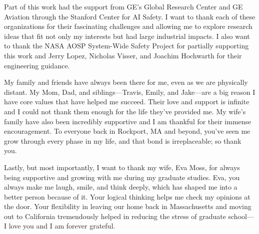 Part of this work had the support from GE's Global Research Center and GE Aviation through the Stanford Center for AI Safety.
I want to thank each of these organizations for their fascinating challenges and allowing me to explore research ideas that fit not only my interests but had large industrial impacts.
I also want to thank the NASA AOSP System-Wide Safety Project for partially supporting this work and Jerry Lopez, Nicholas Visser, and Joachim Hochwarth for their engineering guidance.

My family and friends have always been there for me, even as we are physically distant.
My Mom, Dad, and siblings---Travis, Emily, and Jake---are a big reason I have core values that have helped me succeed.
Their love and support is infinite and I could not thank them enough for the life they've provided me.
My wife's family have also been incredibly supportive and I am thankful for their immense encouragement.
To everyone back in Rockport, MA and beyond, you've seen me grow through every phase in my life, and that bond is irreplaceable; so thank you.

Lastly, but most importantly, I want to thank my wife, Eva Moss, for always being supportive and growing with me during my graduate studies.
Eva, you always make me laugh, smile, and think deeply, which has shaped me into a better person because of it.
Your logical thinking helps me check my opinions at the door.
Your flexibility in leaving our home back in Massachusetts and moving out to California tremendously helped in reducing the stress of graduate school---I love you and I am forever grateful.
